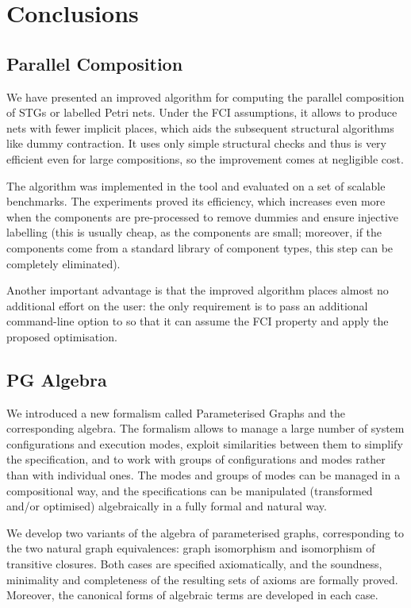 \chapter{Conclusions}

\section{Parallel Composition}\label{sec_conclusion}

We have presented an improved algorithm for computing the
parallel composition of STGs or labelled Petri nets. Under the
FCI assumptions, it allows to produce nets with fewer implicit
places, which aids the subsequent structural algorithms like
dummy contraction. It uses only simple structural checks and
thus is very efficient even for large compositions, so the
improvement comes at negligible cost.

The algorithm was implemented in the \pcomp tool and evaluated
on a set of scalable benchmarks. The experiments proved its
efficiency, which increases even more when the components are
pre-processed to remove dummies and ensure injective labelling
(this is usually cheap, as the components are small; moreover,
if the components come from a standard library of component
types, this step can be completely eliminated).

Another important advantage is that the improved algorithm
places almost no additional effort on the user: the only
requirement is to pass an additional command-line option to
\pcomp so that it can assume the FCI property and apply the
proposed optimisation.


\section{PG Algebra}

We introduced a new formalism called Parameterised Graphs and the
corresponding algebra. The formalism allows to manage a large number
of system configurations and execution modes, exploit similarities
between them to simplify the specification, and to work with groups
of configurations and modes rather than with individual ones. The
modes and groups of modes can be managed in a compositional way, and
the specifications can be manipulated (transformed and/or optimised)
algebraically in a fully formal and natural way.

We develop two variants of the algebra of parameterised graphs, corresponding
to the two natural graph equivalences: graph isomorphism and isomorphism
of transitive closures. Both cases are specified axiomatically, and
the soundness, minimality and completeness of the resulting sets of
axioms are formally proved. Moreover, the canonical forms of algebraic
terms are developed in each case.

